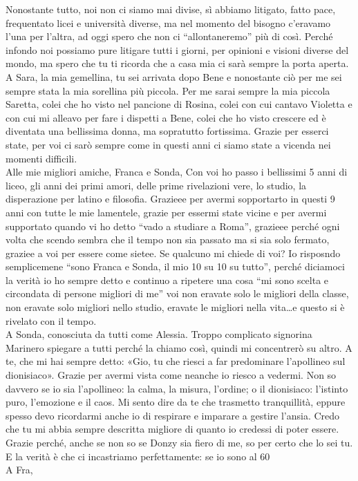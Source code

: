 Nonostante tutto, noi non ci siamo mai divise, sì abbiamo litigato, fatto pace, frequentato licei e università diverse, ma nel momento del bisogno c’eravamo l’una per l’altra, ad oggi spero che non ci “allontaneremo” più di così. Perché infondo noi possiamo pure litigare tutti i giorni, per opinioni e visioni diverse del mondo, ma spero che tu ti ricorda che a casa mia ci sarà sempre la porta aperta.
A Sara, la mia gemellina, tu sei arrivata dopo Bene e nonostante ciò per me sei sempre stata la mia sorellina più piccola. Per me sarai sempre la mia piccola Saretta, colei che ho visto nel pancione di Rosina, colei con cui cantavo Violetta e con cui mi alleavo per fare i dispetti a Bene, colei che ho visto crescere ed è diventata una bellissima donna, ma sopratutto fortissima. 
Grazie per esserci state, per voi ci sarò sempre come in questi anni ci siamo state a vicenda nei momenti difficili.
\\
Alle mie migliori amiche, Franca e Sonda,
Con voi ho passo i bellissimi 5 anni di liceo, gli anni dei primi amori, delle prime rivelazioni vere, lo studio, la disperazione per latino e filosofia. Grazieee per avermi sopportarto in questi 9 anni con tutte le mie lamentele, grazie per essermi state vicine e per avermi supportato quando vi ho detto “vado a studiare a Roma”, grazieee perché ogni volta che scendo sembra che il tempo non sia passato ma si sia solo fermato, graziee a voi per essere come sietee. Se qualcuno mi chiede di voi? Io risposndo semplicemene “sono Franca e Sonda, il mio 10 su 10 su tutto”, perché diciamoci la verità io ho sempre detto e continuo a ripetere una cosa “mi sono scelta e circondata di persone migliori di me” voi non eravate solo le migliori della classe, non eravate solo migliori nello studio, eravate le migliori nella vita…e questo si è rivelato con il tempo. 
\\
A Sonda, conosciuta da tutti come Alessia.
Troppo complicato signorina Marinero spiegare a tutti perché la chiamo così, quindi mi concentrerò su altro. A te, che mi hai sempre detto: «Gio, tu che riesci a far predominare l’apollineo sul dionisiaco».
Grazie per avermi vista come neanche io riesco a vedermi. Non so davvero se io sia l’apollineo: la calma, la misura, l’ordine; o il dionisiaco: l'istinto puro, l'emozione e il caos. Mi sento dire da te che trasmetto tranquillità, eppure spesso devo ricordarmi anche io di respirare e imparare a gestire l’ansia.
Credo che tu mi abbia sempre descritta migliore di quanto io credessi di poter essere. Grazie perché, anche se non so se Donzy sia fiero di me, so per certo che lo sei tu. E la verità è che ci incastriamo perfettamente: se io sono al 60%
\\
A Fra, 

